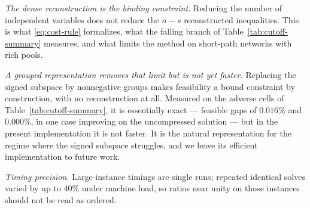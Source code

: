 \documentclass[11pt]{article}
\begin{document}
\emph{The dense reconstruction is the binding constraint.} Reducing the number of independent
variables does not reduce the $n-s$ reconstructed inequalities. This is what
\eqref{eq:cost-rule} formalizes, what the falling branch of Table~\ref{tab:cutoff-summary}
measures, and what limits the method on short-path networks with rich pools.

\emph{A grouped representation removes that limit but is not yet faster.} Replacing the
signed subspace by nonnegative groups makes feasibility a bound constraint by construction,
with no reconstruction at all. Measured on the adverse cells of
Table~\ref{tab:cutoff-summary}, it is essentially exact --- feasible gaps of $0.016\%$ and
$0.000\%$, in one case improving on the uncompressed solution --- but in the present
implementation it is not faster. It is the natural representation for the regime where the
signed subspace struggles, and we leave its efficient implementation to future work.

\emph{Timing precision.} Large-instance timings are single runs; repeated identical solves
varied by up to $40\%$ under machine load, so ratios near unity on those instances should not
be read as ordered.
\end{document}
